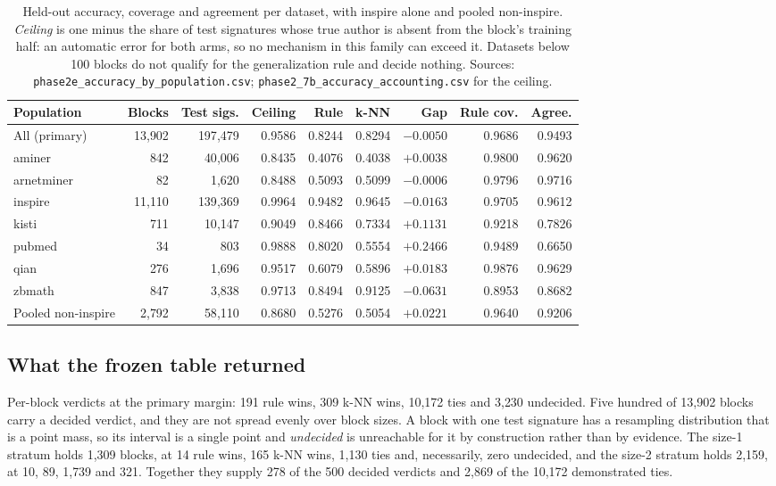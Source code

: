 \documentclass[11pt]{article}
\begin{document}
\begin{table}[htbp]
\centering
\caption{Held-out accuracy, coverage and agreement per dataset, with inspire
alone and pooled non-inspire. \emph{Ceiling} is one minus the share of test
signatures whose true author is absent from the block's training half: an
automatic error for both arms, so no mechanism in this family can exceed it.
Datasets below 100 blocks do not qualify for the generalization rule and
decide nothing. Sources: \texttt{phase2e\_accuracy\_by\_population.csv};
\texttt{phase2\_7b\_accuracy\_accounting.csv} for the ceiling.}
\label{tab:accuracy}
\small
\begin{tabular}{lrrrrrrrr}
\toprule
Population & Blocks & Test sigs. & Ceiling & Rule & k-NN & Gap & Rule cov. & Agree. \\
\midrule
All (primary) & 13{,}902 & 197{,}479 & 0.9586 & 0.8244 & 0.8294 & $-0.0050$ & 0.9686 & 0.9493 \\
\midrule
aminer & 842 & 40{,}006 & 0.8435 & 0.4076 & 0.4038 & $+0.0038$ & 0.9800 & 0.9620 \\
arnetminer & 82 & 1{,}620 & 0.8488 & 0.5093 & 0.5099 & $-0.0006$ & 0.9796 & 0.9716 \\
inspire & 11{,}110 & 139{,}369 & 0.9964 & 0.9482 & 0.9645 & $-0.0163$ & 0.9705 & 0.9612 \\
kisti & 711 & 10{,}147 & 0.9049 & 0.8466 & 0.7334 & $+0.1131$ & 0.9218 & 0.7826 \\
pubmed & 34 & 803 & 0.9888 & 0.8020 & 0.5554 & $+0.2466$ & 0.9489 & 0.6650 \\
qian & 276 & 1{,}696 & 0.9517 & 0.6079 & 0.5896 & $+0.0183$ & 0.9876 & 0.9629 \\
zbmath & 847 & 3{,}838 & 0.9713 & 0.8494 & 0.9125 & $-0.0631$ & 0.8953 & 0.8682 \\
\midrule
Pooled non-inspire & 2{,}792 & 58{,}110 & 0.8680 & 0.5276 & 0.5054 & $+0.0221$ & 0.9640 & 0.9206 \\
\bottomrule
\end{tabular}
\end{table}

\subsection{What the frozen table returned}
\label{sec:h2h3}

Per-block verdicts at the primary margin: 191 rule wins, 309 k-NN wins,
10{,}172 ties and 3{,}230 undecided. Five hundred of 13{,}902 blocks carry a
decided verdict, and they are not spread evenly over block sizes. A block with
one test signature has a resampling distribution that is a point mass, so its
interval is a single point and \emph{undecided} is unreachable for it by
construction rather than by evidence. The size-1 stratum holds 1{,}309 blocks,
at 14 rule wins, 165 k-NN wins, 1{,}130 ties and, necessarily, zero undecided,
and the size-2 stratum holds 2{,}159, at 10, 89, 1{,}739 and 321. Together
they supply 278 of the 500 decided verdicts and 2{,}869 of the 10{,}172
demonstrated ties.
\end{document}

